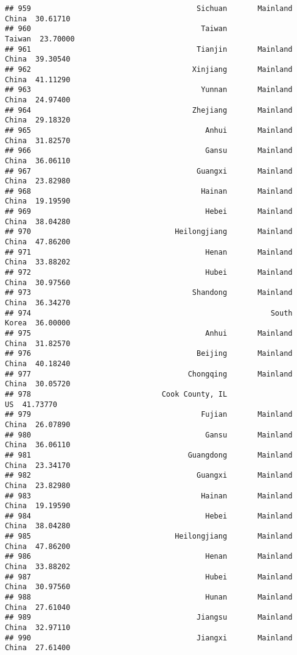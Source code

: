 \documentclass[
]{article}
\begin{document}
\begin{verbatim}
## 959                                      Sichuan       Mainland China  30.61710
## 960                                       Taiwan               Taiwan  23.70000
## 961                                      Tianjin       Mainland China  39.30540
## 962                                     Xinjiang       Mainland China  41.11290
## 963                                       Yunnan       Mainland China  24.97400
## 964                                     Zhejiang       Mainland China  29.18320
## 965                                        Anhui       Mainland China  31.82570
## 966                                        Gansu       Mainland China  36.06110
## 967                                      Guangxi       Mainland China  23.82980
## 968                                       Hainan       Mainland China  19.19590
## 969                                        Hebei       Mainland China  38.04280
## 970                                 Heilongjiang       Mainland China  47.86200
## 971                                        Henan       Mainland China  33.88202
## 972                                        Hubei       Mainland China  30.97560
## 973                                     Shandong       Mainland China  36.34270
## 974                                                       South Korea  36.00000
## 975                                        Anhui       Mainland China  31.82570
## 976                                      Beijing       Mainland China  40.18240
## 977                                    Chongqing       Mainland China  30.05720
## 978                              Cook County, IL                   US  41.73770
## 979                                       Fujian       Mainland China  26.07890
## 980                                        Gansu       Mainland China  36.06110
## 981                                    Guangdong       Mainland China  23.34170
## 982                                      Guangxi       Mainland China  23.82980
## 983                                       Hainan       Mainland China  19.19590
## 984                                        Hebei       Mainland China  38.04280
## 985                                 Heilongjiang       Mainland China  47.86200
## 986                                        Henan       Mainland China  33.88202
## 987                                        Hubei       Mainland China  30.97560
## 988                                        Hunan       Mainland China  27.61040
## 989                                      Jiangsu       Mainland China  32.97110
## 990                                      Jiangxi       Mainland China  27.61400

\end{verbatim}
\end{document}
